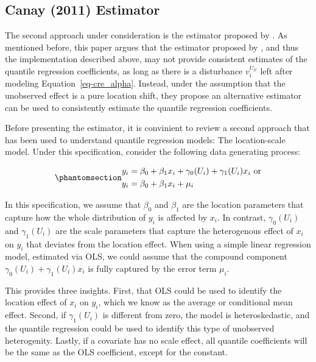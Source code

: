 \documentclass[bib]{statapress}
\begin{document}
\subsection{Canay (2011) Estimator}\label{sec-canay}

The second approach under consideration is the estimator proposed by
\citet{canay2011}. As mentioned before, this paper argues that the
estimator proposed by \citet{abrevaya2008}, and thus the implementation
described above, may not provide consistent estimates of the quantile
regression coefficients, as long as there is a disturbance
\(v^{U_{it}}_i\) left after modeling Equation~\ref{eq-cre_alpha}.
Instead, under the assumption that the unobserved effect is a pure
location shift, they propose an alternative estimator can be used to
consistently estimate the quantile regression coefficients.

Before presenting the estimator, it is convinient to review a second
approach that has been used to understand quantile regression models:
The location-scale model. Under this specification, consider the
following data generating process:

\begin{equation}\phantomsection\label{eq-loc-scale}{\begin{aligned}
y_i &= \beta_0+\beta_1 x_i + \gamma_0(U_i) + \gamma_1(U_i) x_{i} \ \text{or}\\
y_i &= \beta_0+\beta_1 x_i + \mu_i
\end{aligned}
}\end{equation}

In this specification, we assume that \(\beta_0\) and \(\beta_1\) are
the location parameters that capture how the whole distribution of
\(y_i\) is affected by \(x_i\). In contrast, \(\gamma_0(U_i)\) and
\(\gamma_1(U_i)\) are the scale parameters that capture the heterogenous
effect of \(x_i\) on \(y_i\) that deviates from the location effect.
When using a simple linear regression model, estimated via OLS, we could
assume that the compound component
\(\gamma_0(U_i) + \gamma_1(U_i) x_{i}\) is fully captured by the error
term \(\mu_i\).

This provides three insights. First, that OLS could be used to identify
the location effect of \(x_i\) on \(y_i\), which we know as the average
or conditional mean effect. Second, if \(\gamma_1(U_i)\) is different
from zero, the model is heteroskedastic, and the quantile regression
could be used to identify this type of unobserved heterogenity. Lastly,
if a covariate has no scale effect, all quantile coefficients will be
the same as the OLS coefficient, except for the constant.
\end{document}
